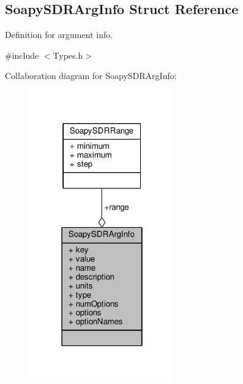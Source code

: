 \subsection{Soapy\+S\+D\+R\+Arg\+Info Struct Reference}
\label{structSoapySDRArgInfo}


Definition for argument info.  




{\ttfamily \#include $<$Types.\+h$>$}



Collaboration diagram for Soapy\+S\+D\+R\+Arg\+Info\+:
\nopagebreak
\begin{figure}[H]
\begin{center}
\leavevmode
\includegraphics[width=178pt]{d9/d03/structSoapySDRArgInfo__coll__graph}
\end{center}
\end{figure}

